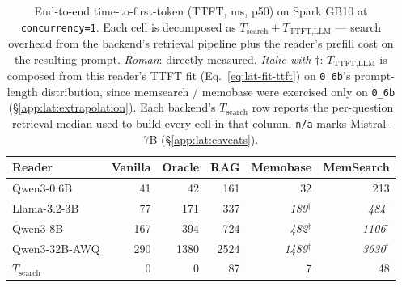 \begin{table}[!htbp]
\centering
\small
\caption{End-to-end time-to-first-token (TTFT, ms, p50) on Spark GB10 at \texttt{concurrency=1}. Each cell is decomposed as $T_{\text{search}} + T_{\text{TTFT,LLM}}$ — search overhead from the backend's retrieval pipeline plus the reader's prefill cost on the resulting prompt. \emph{Roman}: directly measured. \emph{Italic with $\dagger$}: $T_{\text{TTFT,LLM}}$ is composed from this reader's TTFT fit (Eq.~\ref{eq:lat-fit-ttft}) on \texttt{0\_6b}'s prompt-length distribution, since memsearch / memobase were exercised only on \texttt{0\_6b} (\S\ref{app:lat:extrapolation}). Each backend's $T_{\text{search}}$ row reports the per-question retrieval median used to build every cell in that column. \texttt{n/a} marks Mistral-7B (\S\ref{app:lat:caveats}).}
\label{tab:ttft-main}
\setlength{\tabcolsep}{4pt}
\begin{tabular}{lrrrrr}
\toprule
Reader & Vanilla & Oracle & RAG & Memobase & MemSearch \\
\midrule
Qwen3-0.6B & 41 & 42 & 161 & 32 & 213 \\
Llama-3.2-3B & 77 & 171 & 337 & \textit{189}$^\dagger$ & \textit{484}$^\dagger$ \\
Qwen3-8B & 167 & 394 & 724 & \textit{482}$^\dagger$ & \textit{1106}$^\dagger$ \\
Qwen3-32B-AWQ & 290 & 1380 & 2524 & \textit{1489}$^\dagger$ & \textit{3630}$^\dagger$ \\
\midrule
$T_{\text{search}}$ & 0 & 0 & 87 & 7 & 48 \\
\bottomrule
\end{tabular}
\end{table}
